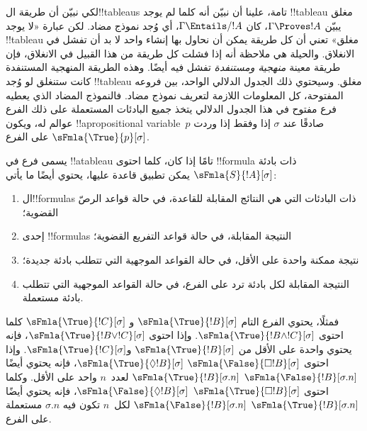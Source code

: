 \documentclass[../../../include/open-logic-section]{subfiles}
\begin{document}


\begin{explain}
  لكي نبيّن أن طريقة ال!!{tableau}s تامة، علينا أن نبيّن أنه كلما لم
  يوجد !!{tableau} مغلق يبيّن $\Gamma \Proves !A$، كان
  $\Gamma \Entails/ !A$، أي وُجد نموذج مضاد. لكن عبارة «لا يوجد
  !!{tableau} مغلق» تعني أن كل طريقة يمكن أن نحاول بها إنشاء واحد لا
  بد أن تفشل في الانغلاق. والحيلة هي ملاحظة أنه إذا فشلت كل طريقة من
  هذا القبيل في الانغلاق، فإن طريقة معينة \emph{منهجية ومستنفدة} تفشل
  فيه أيضًا. وهذه الطريقة المنهجية المستنفدة كانت ستنغلق لو وُجد
  !!{tableau} مغلق. وسيحتوي ذلك الجدول الدلالي الواحد، بين فروعه
  المفتوحة، كل المعلومات اللازمة لتعريف نموذج مضاد. فالنموذج المضاد
  الذي يعطيه فرع مفتوح في هذا الجدول الدلالي يتخذ جميع البادئات
  المستعملة على ذلك الفرع عوالم له، ويكون !!a{propositional
    variable}~$p$ صادقًا عند $\sigma$ إذا وفقط إذا وردت
  $\sFmla{\True}{p}[\sigma]$ على الفرع.
\end{explain}

\begin{defn}
  يسمى فرع في !!a{tableau} تامًا إذا كان، كلما احتوى !!{formula} ذات
  بادئة $\sFmla{S}{!A}[\sigma]$ يمكن تطبيق قاعدة عليها، يحتوي أيضًا
  ما يأتي:
  \begin{enumerate}
    \item ال!!{formula}s ذات البادئات التي هي النتائج المقابلة
      للقاعدة، في حالة قواعد الرصّ القضوية؛
    \item إحدى !!{formula}s النتيجة المقابلة، في حالة قواعد التفريع
      القضوية؛
    \item نتيجة ممكنة واحدة على الأقل، في حالة القواعد الموجهية التي
      تتطلب بادئة جديدة؛
    \item النتيجة المقابلة لكل بادئة ترد على الفرع، في حالة القواعد
      الموجهية التي تتطلب بادئة مستعملة.
  \end{enumerate}
\end{defn}

\begin{explain}
فمثلًا، يحتوي الفرع التام $\sFmla{\True}{!B}[\sigma]$ و
$\sFmla{\True}{!C}[\sigma]$ كلما احتوى
$\sFmla{\True}{!B \land !C}[\sigma]$. وإذا احتوى
$\sFmla{\True}{!B \lor !C}[\sigma]$، فإنه يحتوي واحدة على الأقل من
$\sFmla{\True}{!B}[\sigma]$ و$\sFmla{\True}{!C}[\sigma]$. وإذا احتوى
 {$\sFmla{\False}{\Box !B}[\sigma]$}
{$\sFmla{\True}{\Diamond !B}[\sigma]$}، فإنه يحتوي أيضًا
 {$\sFmla{\False}{!B}[\sigma.n]$}
{$\sFmla{\True}{!B}[\sigma.n]$} لعدد~$n$ واحد على الأقل. وكلما احتوى
 {$\sFmla{\True}{\Box !B}[\sigma]$}
{$\sFmla{\False}{\Diamond !B}[\sigma]$}، فإنه يحتوي أيضًا
 {$\sFmla{\True}{!B}[\sigma.n]$}
{$\sFmla{\False}{!B}[\sigma.n]$} لكل~$n$ تكون فيه $\sigma.n$
مستعملة على الفرع.
\end{explain}
\end{document}
